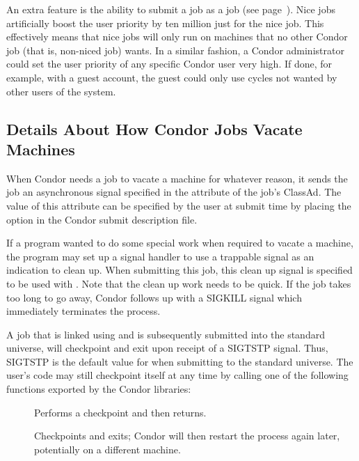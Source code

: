 An extra feature is the ability to submit a job as
a  job (see page~\pageref{man-condor-submit-nice}).
Nice jobs artificially boost the user priority 
by ten million just for the nice job.
This effectively means that nice jobs will only run on
machines that no other Condor job (that is, non-niced job) wants.
In a similar fashion, a Condor administrator could set
the user priority of any specific Condor user very high.
If done, for example, with a guest account,
the guest could only use cycles not wanted by other users of the system.


\subsection{\label{sec:Vacate-Explained}
Details About How Condor Jobs Vacate Machines}

When Condor needs a job to vacate a machine for whatever reason, it
sends the job an asynchronous signal specified in the 
attribute of the job's ClassAd.
The value of this attribute can be specified by
the user at submit time by placing the  option in the
Condor submit description file.  

If a program wanted to do some special work when required
to vacate a machine, the program may set up a
signal handler to use a trappable signal as an indication
to clean up.
When submitting this job, this clean up signal is specified to be used with
.
Note that the clean up work needs to be quick.
If the job takes too long to go away, Condor
follows up with a SIGKILL signal which immediately terminates the
process.

A job that is linked using 
and is subsequently submitted into the standard universe, 
will checkpoint and exit upon receipt of a SIGTSTP signal.
Thus, SIGTSTP is
the default value for  when submitting to the standard
universe.
The user's code may still checkpoint itself at any time
by calling one of the following functions exported by the Condor libraries:
\begin{description}
\item[] Performs a checkpoint and then returns.
\item[] Checkpoints and exits; Condor will then
restart the process again later, potentially on a different machine.
\end{description}

